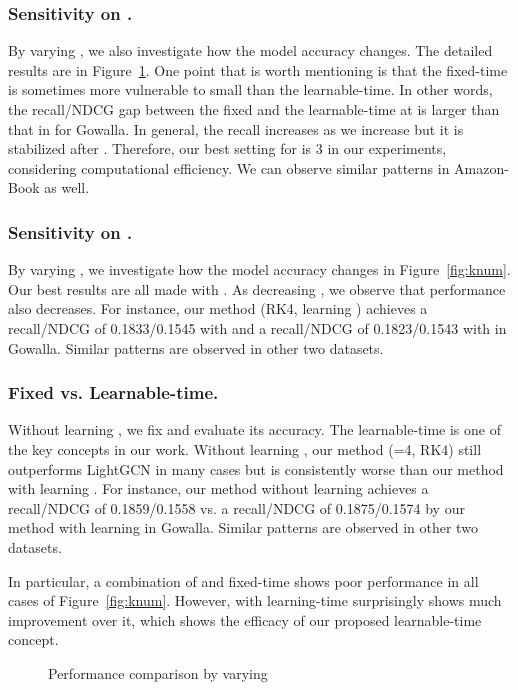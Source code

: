 \documentclass[sigconf]{acmart}
\begin{document}
\subsubsection{Sensitivity on .} By varying , we also investigate how the model accuracy changes. The detailed results are in Figure~\ref{fig:tnum}. One point that is worth mentioning is that the fixed-time is sometimes more vulnerable to small  than the learnable-time. In other words, the recall/NDCG gap between the fixed and the learnable-time at  is larger than that in  for Gowalla. In general, the recall increases as we increase  but it is stabilized after . Therefore, our best setting for  is 3 in our experiments, considering computational efficiency. We can observe similar patterns in Amazon-Book as well.

\subsubsection{Sensitivity on .} By varying , we investigate how the model accuracy changes in Figure~\ref{fig:knum}. Our best results are all made with . As decreasing , we observe that performance also decreases. For instance, our method (RK4, learning ) achieves a recall/NDCG of 0.1833/0.1545 with  and a recall/NDCG of 0.1823/0.1543 with  in Gowalla. Similar patterns are observed in other two datasets.

\subsubsection{Fixed vs. Learnable-time.} Without learning , we fix  and evaluate its accuracy. The learnable-time is one of the key concepts in our work. Without learning , our method (=4, RK4) still outperforms LightGCN in many cases but is consistently worse than our method with learning . For instance, our method without learning  achieves a recall/NDCG of 0.1859/0.1558 vs. a recall/NDCG of 0.1875/0.1574 by our method with learning  in Gowalla. Similar patterns are observed in other two datasets.

In particular, a combination of  and fixed-time shows poor performance in all cases of Figure~\ref{fig:knum}. However,  with learning-time surprisingly shows much improvement over it, which shows the efficacy of our proposed learnable-time concept.

\begin{figure}[t]
\centering
{}
\caption{Performance comparison by varying } \label{fig:tnum}
\end{figure}
\end{document}
